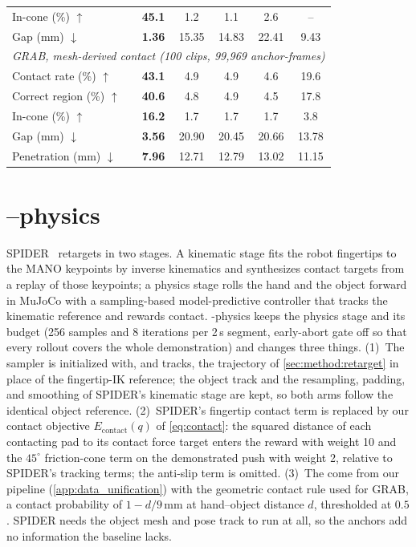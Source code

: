 \begin{table}[t]
\begin{tabular}{lccccc}
        \quad In-cone (\%) $\uparrow$ & \textbf{45.1} & 1.2 & 1.1 & 2.6 & -- \\
        \quad Gap (mm) $\downarrow$ & \textbf{1.36} & 15.35 & 14.83 & 22.41 & 9.43 \\
        \midrule
        \multicolumn{6}{l}{\emph{GRAB, mesh-derived contact (100 clips, 99{,}969 anchor-frames)}} \\
        \quad Contact rate (\%) $\uparrow$ & \textbf{43.1} & 4.9 & 4.9 & 4.6 & 19.6 \\
        \quad Correct region (\%) $\uparrow$ & \textbf{40.6} & 4.8 & 4.9 & 4.5 & 17.8 \\
        \quad In-cone (\%) $\uparrow$ & \textbf{16.2} & 1.7 & 1.7 & 1.7 & 3.8 \\
        \quad Gap (mm) $\downarrow$ & \textbf{3.56} & 20.90 & 20.45 & 20.66 & 13.78 \\
        \quad Penetration (mm) $\downarrow$ & \textbf{7.96} & 12.71 & 12.79 & 13.02 & 11.15 \\
        \bottomrule
    \end{tabular}
\end{table}

\section{\ours--physics}
\label{app:physics}

 SPIDER~\citep{spider} retargets in two stages. A kinematic stage fits the robot fingertips to the MANO keypoints by inverse kinematics and synthesizes contact targets from a replay of those keypoints; a physics stage rolls the hand and the object forward in MuJoCo with a sampling-based model-predictive controller that tracks the kinematic reference and rewards contact. \ours-physics keeps the physics stage and its budget (256 samples and 8 iterations per 2\,s segment, early-abort gate off so that every rollout covers the whole demonstration) and changes three things. (1)~The sampler is initialized with, and tracks, the \ours trajectory of \cref{sec:method:retarget} in place of the fingertip-IK reference; the object track and the resampling, padding, and smoothing of SPIDER's kinematic stage are kept, so both arms follow the identical object reference. (2)~SPIDER's fingertip contact term is replaced by our contact objective $E_{\mathrm{contact}}(q)$ of \cref{eq:contact}: the squared distance of each contacting pad to its contact force target enters the reward with weight 10 and the $45^\circ$ friction-cone term on the demonstrated push with weight 2, relative to SPIDER's tracking terms; the anti-slip term is omitted. (3)~The \fca come from our pipeline (\cref{app:data_unification}) with the geometric contact rule used for GRAB, a contact probability of $1 - d/9\,\mathrm{mm}$ at hand--object distance $d$, thresholded at $0.5$. SPIDER needs the object mesh and pose track to run at all, so the anchors add no information the baseline lacks.

